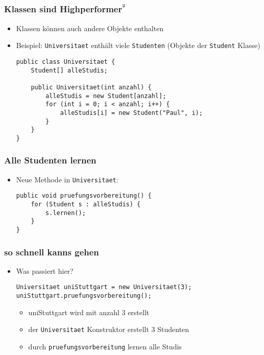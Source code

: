 \documentclass{../../presentation}
\begin{document}
\begin{frame}[fragile]
	\frametitle{Klassen sind Highperformer\textsuperscript{²}}
	\pause
	\begin{itemize}
		\item Klassen können auch andere Objekte enthalten
		      \pause
		\item Beispiel: \texttt{Universitaet} enthält viele \texttt{Studenten} (Objekte der \texttt{Student} Klasse)
		      \pause
		      \begin{verbatim}
public class Universitaet {
    Student[] alleStudis;

    public Universitaet(int anzahl) {
        alleStudis = new Student[anzahl];
        for (int i = 0; i < anzahl; i++) {
            alleStudis[i] = new Student("Paul", i);
        }
    }
}
\end{verbatim}
	\end{itemize}
\end{frame}

\begin{frame}[fragile]
	\frametitle{Alle Studenten lernen}

	\begin{itemize}
		\item<2-> Neue Methode in \texttt{Universitaet}:
		      \begin{verbatim}
public void pruefungsvorbereitung() {
	for (Student s : alleStudis) {
		s.lernen();
	}
}
\end{verbatim}
	\end{itemize}
\end{frame}
\begin{frame}[fragile]
	\frametitle{so schnell kanns gehen}

	\begin{itemize}
		\item<2-> Was passiert hier?
		      \begin{verbatim}
Universitaet uniStuttgart = new Universitaet(3);
uniStuttgart.pruefungsvorbereitung();
\end{verbatim}
		      \begin{itemize}
			      \item<3->[\textbullet]uniStuttgart wird mit anzahl 3 erstellt
			      \item<4->[\textbullet]der \texttt{Universitaet} Konstruktor erstellt 3 Studenten
			      \item<5->[\textbullet]durch \texttt{pruefungsvorbereitung} lernen alle Studis
		      \end{itemize}
	\end{itemize}
\end{frame}
\end{document}

